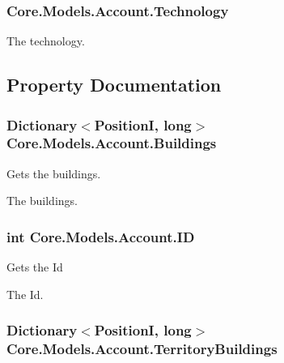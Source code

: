 \subsubsection[{Technology}]{ Core.\+Models.\+Account.\+Technology}\label{classCore_1_1Models_1_1Account_acab414d9e49038c2f7c873a22621bff8}


The technology. 



\subsection{Property Documentation}
\hypertarget{classCore_1_1Models_1_1Account_acfadcbec3d6f151ade9cd14fe3c95f9e}{}
\subsubsection[{Buildings}]{\setlength{\rightskip}{0pt plus 5cm}Dictionary$<${\bf Position\+I}, long$>$ Core.\+Models.\+Account.\+Buildings\hspace{0.3cm}{\ttfamily [get]}}\label{classCore_1_1Models_1_1Account_acfadcbec3d6f151ade9cd14fe3c95f9e}


Gets the buildings. 

The buildings.\hypertarget{classCore_1_1Models_1_1Account_a7d03d99ad8aef36cd306111624ee9664}{}
\subsubsection[{I\+D}]{\setlength{\rightskip}{0pt plus 5cm}int Core.\+Models.\+Account.\+I\+D\hspace{0.3cm}{\ttfamily [get]}}\label{classCore_1_1Models_1_1Account_a7d03d99ad8aef36cd306111624ee9664}


Gets the Id 

The Id.\hypertarget{classCore_1_1Models_1_1Account_a6025997911a09ad2d4917e1bd8e6cf06}{}
\subsubsection[{Territory\+Buildings}]{\setlength{\rightskip}{0pt plus 5cm}Dictionary$<${\bf Position\+I}, long$>$ Core.\+Models.\+Account.\+Territory\+Buildings\hspace{0.3cm}{\ttfamily [get]}}\label{classCore_1_1Models_1_1Account_a6025997911a09ad2d4917e1bd8e6cf06}


